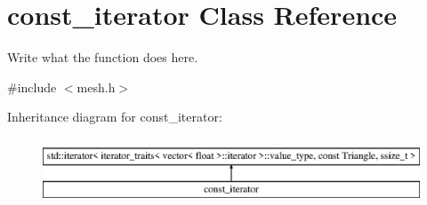 \hypertarget{classconst__iterator}{\section{const\+\_\+iterator Class Reference}
\label{classconst__iterator}
}


Write what the function does here.  




{\ttfamily \#include $<$mesh.\+h$>$}

Inheritance diagram for const\+\_\+iterator\+:\begin{figure}[H]
\begin{center}
\leavevmode
\includegraphics[height=2.000000cm]{classconst__iterator}
\end{center}
\end{figure}
